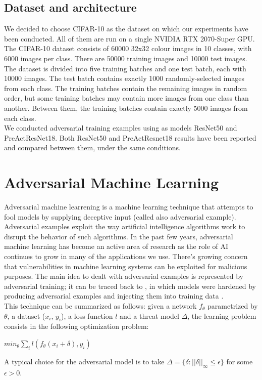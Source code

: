 \documentclass{article}
\begin{document}
\subsection{Dataset and architecture}

We decided to choose CIFAR-10 as the dataset on which our experiments have been
conducted. All of them are run on a single NVIDIA RTX 2070-Super GPU.\\
The CIFAR-10 dataset consists of 60000 32x32 colour images in 10 classes, with
6000 images per class. There are 50000 training images and 10000 test images.
The dataset is divided into five training batches and one test batch, each with
10000 images. The test batch contains exactly 1000 randomly-selected images from
each class. The training batches contain the remaining images in random order,
but some training batches may contain more images from one class than another.
Between them, the training batches contain exactly 5000 images from each
class.\\
We conducted adversarial training examples using as models ResNet50 and
PreActResNet18. Both ResNet50 and PreActResnet18 results have been reported and
compared between them, under the same conditions. 


\section{Adversarial Machine Learning}
Adversarial machine learrening is a machine learning technique that attempts to
fool models by supplying deceptive input (called also adversarial example).
Adversarial examples exploit the way artificial intelligence algorithms work to
disrupt the behavior of such algorithms. In the past few years, adversarial
machine learning has become an active area of research as the role of AI
continues to grow in many of the applications we use. There’s growing concern
that vulnerabilities in machine learning systems can be exploited for malicious
purposes. The main idea to dealt with adversarial examples is represented by
adversarial training; it can be traced back to \cite{GoodfellowEtAl2015}, in
which models were hardened by producing adversarial examples and injecting them
into training data \cite{ShafahiEtAl2019b}.\\
This technique can be summarized as follows: given a network $f_{\theta}$
parametrized by $\theta$, a dataset ($x_i$, $y_i$), a loss function $l$ and a
threat model $\Delta$, the learning problem consists in the following
optimization problem:
\begin{center}
	$min_{\theta}{\sum_{i}l(f_{\theta}(x_i + \delta), y_i)}$
\end{center}
A typical choice for the adversarial model is to take $\Delta = \{\delta :
||\delta||_{\infty} \le \epsilon\}$ for some $\epsilon > 0$.
\end{document}
